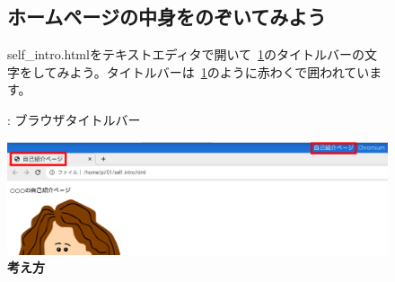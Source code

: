 \documentclass[a4paper,12pt]{jarticle}
\begin{document}
\clearpage
\begin{figure}[ht]
  \subsection{\theExercise ホームページの中身をのぞいてみよう}
  self\_intro.htmlをテキストエディタで開いて~\ref{seq:refFigure31}のタイトルバーの文字をしてみよう。タイトルバーは~\ref{seq:refFigure31}のように赤わくで囲われています。


  \bigskip



  \centering
  \begin{minipage}{\textwidth}
    {\upshape
      {\theFigure\label{seq:refFigure31}}:
      ブラウザタイトルバー}
  \end{minipage}

  \centering
  \includegraphics[width=\textwidth]{textbook-img143.png}
  \flushleft
  \textbf{考え方}


\end{figure}
\end{document}
